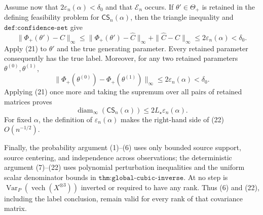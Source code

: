 Assume now that \(2\varepsilon_n(\alpha)<\delta_0\) and that \(\mathcal E_n\) occurs.  If \(\theta'\in\Theta_+\) is retained in the defining feasibility problem for \(\mathsf{CS}_n(\alpha)\), then the triangle inequality and \(\texttt{def:confidence-set}\) give
\[
 \|\Phi_+(\theta')-C\|_\infty
 \leq
 \|\Phi_+(\theta')-\widehat C\|_\infty
 +\|\widehat C-C\|_\infty
 \leq2\varepsilon_n(\alpha)<\delta_0.
\]
Apply (21) to \(\theta'\) and the true generating parameter.  Every retained parameter consequently has the true label.  Moreover, for any two retained parameters \(\theta^{(0)},\theta^{(1)}\),
\[
 \|\Phi_+(\theta^{(0)})-\Phi_+(\theta^{(1)})\|_\infty
 \leq2\varepsilon_n(\alpha)<\delta_0.
\]
Applying (21) once more and taking the supremum over all pairs of retained matrices proves
\[
 \operatorname{diam}_\infty(\mathsf{CS}_n(\alpha))
 \leq2L_\star\varepsilon_n(\alpha).                               \tag{22}
\]
For fixed \(\alpha\), the definition of \(\varepsilon_n(\alpha)\) makes the right-hand side of (22) \(O(n^{-1/2})\).

Finally, the probability argument (1)--(6) uses only bounded source support, source centering, and independence across observations; the deterministic argument (7)--(22) uses polynomial perturbation inequalities and the uniform scalar denominator bounds in \(\texttt{thm:global-cubic-inverse}\).  At no step is \(\operatorname{Var}_P(\operatorname{vech}(X^{\otimes3}))\) inverted or required to have any rank.  Thus (6) and (22), including the label conclusion, remain valid for every rank of that covariance matrix.
